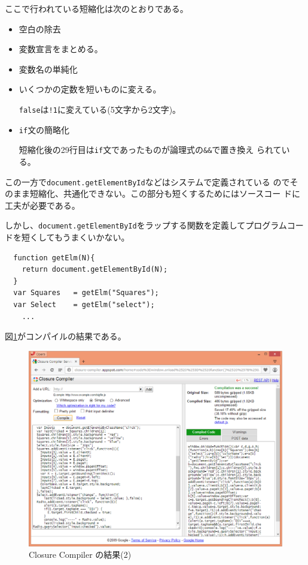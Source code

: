 ここで行われている短縮化は次のとおりである。
\begin{itemize}
 \item 空白の除去
 \item 変数宣言をまとめる。
 \item 変数名の単純化
 \item いくつかの定数を短いものに変える。

			 \texttt{false}は\texttt{!1}に変えている(5文字から2文字)。
 \item \texttt{if}文の簡略化

短縮化後の29行目は\texttt{if}文であったものが論理式の\verb+&&+で置き換え
			 られている。
\end{itemize}
この一方で\texttt{document.getElementById}などはシステムで定義されている
のでそのまま短縮化、共通化できない。この部分も短くするためにはソースコー
ドに工夫が必要である。

しかし、\texttt{document.getElementById}をラップする関数を定義してプログラムコー
 ドを短くしてもうまくいかない。
 \begin{Verbatim}
  function getElm(N){
    return document.getElementById(N);
  }
  var Squares   = getElm("Squares");
  var Select    = getElm("select");
	...
 \end{Verbatim}
 図\ref{closure-compiler-res03}がコンパイルの結果である。
 \begin{figure}[ht]
	\begin{center}
	 \includegraphics[width=1\textwidth]{10-01closur-compiler-res03.eps}
	\end{center}
 \caption{Closure Compiler の結果(2)}\label{closure-compiler-res03}
 \end{figure}

